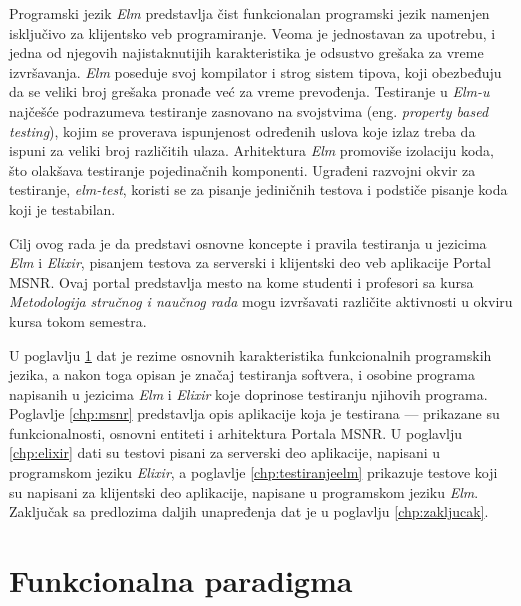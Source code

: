 \documentclass[12pt,oneside]{memoir}
\begin{document}
\par Programski jezik \emph{Elm} predstavlja čist funkcionalan programski jezik namenjen isključivo za klijentsko veb programiranje. Veoma je jednostavan za upotrebu, i jedna od njegovih najistaknutijih karakteristika je odsustvo grešaka za vreme izvršavanja. \emph{Elm} poseduje svoj kompilator i strog sistem tipova, koji obezbeđuju da se veliki broj grešaka pronađe već za vreme prevođenja. Testiranje u \emph{Elm-u} najčešće podrazumeva testiranje zasnovano na svojstvima (eng. \emph{property based testing}), kojim se proverava ispunjenost određenih uslova koje izlaz treba da ispuni za veliki broj različitih ulaza. Arhitektura \emph{Elm} promoviše izolaciju koda, što olakšava testiranje pojedinačnih komponenti. Ugrađeni razvojni okvir za testiranje, \emph{elm-test}, koristi se za pisanje jediničnih testova i podstiče pisanje koda koji je testabilan.
\par Cilj ovog rada je da predstavi osnovne koncepte i pravila testiranja u jezicima \emph{Elm} i \emph{Elixir}, pisanjem testova za serverski i klijentski deo veb aplikacije Portal MSNR. Ovaj portal predstavlja mesto na kome studenti i profesori sa kursa \emph{Metodologija stručnog i naučnog rada} mogu izvršavati različite aktivnosti u okviru kursa tokom semestra. 
\par U poglavlju \ref{chp:uvodnideo} dat je rezime osnovnih karakteristika funkcionalnih programskih jezika, a nakon toga opisan je značaj testiranja softvera, i osobine programa napisanih u jezicima \emph{Elm} i \emph{Elixir} koje doprinose testiranju njihovih programa. Poglavlje \ref{chp:msnr} predstavlja opis aplikacije koja je testirana --- prikazane su funkcionalnosti, osnovni entiteti i arhitektura Portala MSNR. U poglavlju \ref{chp:elixir} dati su testovi pisani za serverski deo aplikacije, napisani u programskom jeziku \emph{Elixir}, a poglavlje \ref{chp:testiranjeelm} prikazuje testove koji su napisani za klijentski deo aplikacije, napisane u programskom jeziku \emph{Elm}. Zaključak sa predlozima daljih unapređenja dat je u poglavlju \ref{chp:zakljucak}. 



\chapter{Funkcionalna paradigma}
\label{chp:uvodnideo}
\end{document}
